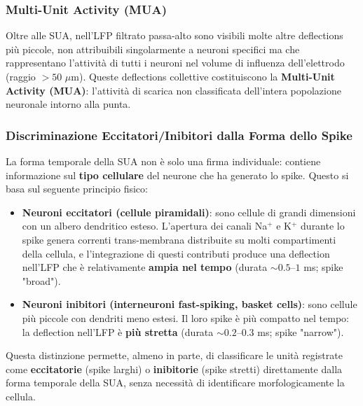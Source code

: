 \subsubsection{Multi-Unit Activity (MUA)}

Oltre alle SUA, nell'LFP filtrato passa-alto sono visibili molte altre deflections più piccole, non attribuibili singolarmente a neuroni specifici ma che rappresentano l'attività di tutti i neuroni nel volume di influenza dell'elettrodo (raggio $> 50$ $\mu$m). Queste deflections collettive costituiscono la \textbf{Multi-Unit Activity (MUA)}: l'attività di scarica non classificata dell'intera popolazione neuronale intorno alla punta.


\subsubsection{Discriminazione Eccitatori/Inibitori dalla Forma dello Spike}

La forma temporale della SUA non è solo una firma individuale: contiene informazione sul \textbf{tipo cellulare} del neurone che ha generato lo spike. Questo si basa sul seguente principio fisico:

\begin{itemize}
    \item \textbf{Neuroni eccitatori (cellule piramidali)}: sono cellule di grandi dimensioni con un albero dendritico esteso. L'apertura dei canali Na$^+$ e K$^+$ durante lo spike genera correnti trans-membrana distribuite su molti compartimenti della cellula, e l'integrazione di questi contributi produce una deflection nell'LFP che è relativamente \textbf{ampia nel tempo} (durata $\sim 0.5$--$1$ ms; spike "broad").
    \item \textbf{Neuroni inibitori (interneuroni fast-spiking, basket cells)}: sono cellule più piccole con dendriti meno estesi. Il loro spike è più compatto nel tempo: la deflection nell'LFP è \textbf{più stretta} (durata $\sim 0.2$--$0.3$ ms; spike "narrow").
\end{itemize}

Questa distinzione permette, almeno in parte, di classificare le unità registrate come \textbf{eccitatorie} (spike larghi) o \textbf{inibitorie} (spike stretti) direttamente dalla forma temporale della SUA, senza necessità di identificare morfologicamente la cellula.


